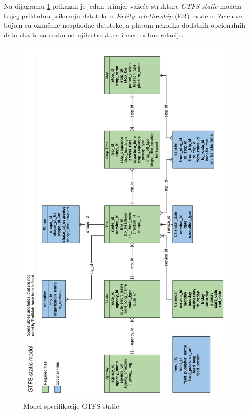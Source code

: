 \documentclass[zavrsnirad]{fer}
\begin{document}
Na dijagramu \ref{slk:gtfs-model} prikazan je jedan primjer važeće strukture \textit{GTFS static} modela kojeg prikladno prikazuju datoteke u \textit{Entity–relationship} (ER) modelu. Zelenom bojom su označene neophodne datoteke, a plavom nekoliko dodatnih opcionalnih datoteka te za svaku od njih struktura i međusobne relacije. 

\begin{figure}[H]
	\centering
	\includegraphics[width=\linewidth-30pt]{Figures/gtfs-model.png}
	\caption{Model specifikacije GTFS static \cite{GTFS-schedule-model}}
	\label{slk:gtfs-model}
\end{figure}
\end{document}

